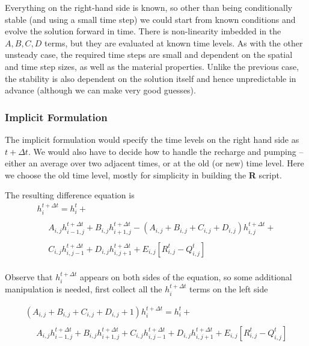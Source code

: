 Everything on the right-hand side is known, so other than being conditionally stable (and using a small time step) we could start from known conditions and evolve the solution forward in time.  
There is non-linearity imbedded in the $A,B,C,D$ terms, but they are evaluated at known time levels.
As with the other unsteady case, the required time steps are small and dependent on the spatial and time step sizes, as well as the material properties. 
Unlike the previous case, the stability is also dependent on the solution itself and hence unpredictable in advance (although we can make very good guesses).

\subsubsection{Implicit Formulation}
The implicit formulation would specify the time levels on the right hand side as $t+ \Delta t$.
We would also have to decide how to handle the recharge and pumping -- either an average over two adjacent times, or at the old (or new) time level.
Here we choose the old time level, mostly for simplicity in building the \textbf{R} script.

The resulting difference equation is
\begin{equation}
\begin{matrix}
h_i^{t+\Delta t} = h_i^{t} + \\
~~~~~~\\
~~~~~~   A_{i,j}h_{i-1,j}^{t+ \Delta t} + B_{i,j}h_{i+1,j}^{t+ \Delta t} - (A_{i,j}+B_{i,j}+C_{i,j}+D_{i,j})h_{i,j}^{t+ \Delta t} + \\
~~~~~~\\
~~~~~~   C_{i,j}h_{i,j-1}^{t+ \Delta t} + D_{i,j}h_{i,j+1}^{t+ \Delta t} + E_{i,j}[R_{i,j}^{t}-Q_{i,j}^{t}]      \\
\end{matrix}        
\end{equation}

Observe that $h_i^{t+\Delta t}$ appears on both sides of the equation, so some additional manipulation is needed, first collect all the $h_i^{t+\Delta t}$ terms on the left side

\begin{equation}
\begin{matrix}
(A_{i,j}+B_{i,j}+C_{i,j}+D_{i,j}+1)h_i^{t+\Delta t} = h_i^{t} + \\
~~~~~~\\
~~~~~~   A_{i,j}h_{i-1,j}^{t+ \Delta t} + B_{i,j}h_{i+1,j}^{t+ \Delta t} + C_{i,j}h_{i,j-1}^{t+ \Delta t} + D_{i,j}h_{i,j+1}^{t+ \Delta t} + E_{i,j}[R_{i,j}^{t}-Q_{i,j}^{t}]      \\
\end{matrix}        
\end{equation}

